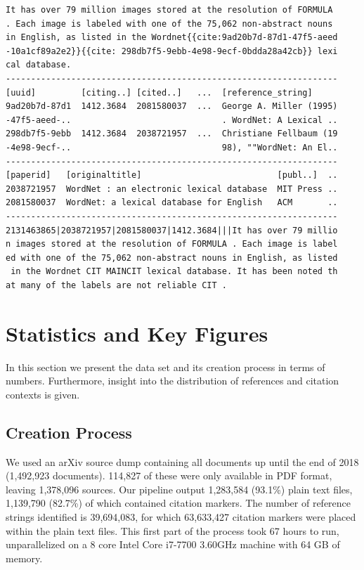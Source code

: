 \begin{lstlisting}[caption={Excerpts from (top to bottom) a paper's plain text, corresponding entries in the references database, entries in the MAG, and extracted citation context CSV},label={lst:formatall}]
It has over 79 million images stored at the resolution of FORMULA 
. Each image is labeled with one of the 75,062 non-abstract nouns 
in English, as listed in the Wordnet{{cite:9ad20b7d-87d1-47f5-aeed
-10a1cf89a2e2}}{{cite: 298db7f5-9ebb-4e98-9ecf-0bdda28a42cb}} lexi
cal database.
------------------------------------------------------------------
[uuid]         [citing..] [cited..]   ...  [reference_string]
9ad20b7d-87d1  1412.3684  2081580037  ...  George A. Miller (1995)
-47f5-aeed-..                              . WordNet: A Lexical ..
298db7f5-9ebb  1412.3684  2038721957  ...  Christiane Fellbaum (19
-4e98-9ecf-..                              98), ""WordNet: An El..
------------------------------------------------------------------
[paperid]   [originaltitle]                           [publ..]  ..
2038721957  WordNet : an electronic lexical database  MIT Press ..
2081580037  WordNet: a lexical database for English   ACM       ..
------------------------------------------------------------------
2131463865|2038721957|2081580037|1412.3684|||It has over 79 millio
n images stored at the resolution of FORMULA . Each image is label
ed with one of the 75,062 non-abstract nouns in English, as listed
 in the Wordnet CIT MAINCIT lexical database. It has been noted th
at many of the labels are not reliable CIT .
\end{lstlisting}

\section{Statistics and Key Figures}
\label{sec:statistics}

In this section we present the data set and its creation process in terms of numbers. Furthermore, insight into the distribution of references and citation contexts is given.

\subsection{Creation Process}
We used an arXiv source dump containing all documents up until the end of 2018 (1,492,923 documents). 114,827 of these were only available in PDF format, leaving 1,378,096 sources. Our pipeline output 1,283,584 (93.1\%) plain text files, 1,139,790 (82.7\%) of which contained citation markers. The number of reference strings identified is 39,694,083, for which 63,633,427 citation markers were placed within the plain text files. This first part of the process took 67 hours to run, unparallelized on a 8 core Intel Core i7-7700 3.60GHz machine with 64 GB of memory.


